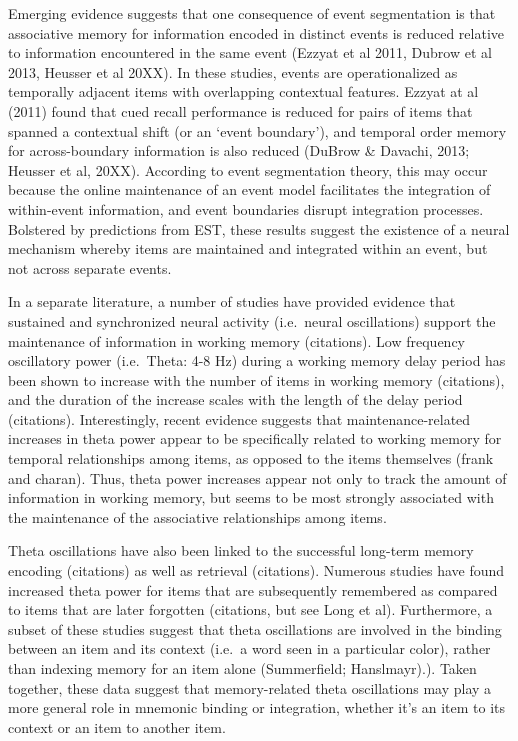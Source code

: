 Emerging evidence suggests that one consequence of event segmentation is
that associative memory for information encoded in distinct events is
reduced relative to information encountered in the same event (Ezzyat et
al 2011, Dubrow et al 2013, Heusser et al 20XX). In these studies,
events are operationalized as temporally adjacent items with overlapping
contextual features. Ezzyat at al (2011) found that cued recall
performance is reduced for pairs of items that spanned a contextual
shift (or an `event boundary'), and temporal order memory for
across-boundary information is also reduced (DuBrow \& Davachi, 2013;
Heusser et al, 20XX). According to event segmentation theory, this may
occur because the online maintenance of an event model facilitates the
integration of within-event information, and event boundaries disrupt
integration processes. Bolstered by predictions from EST, these results
suggest the existence of a neural mechanism whereby items are maintained
and integrated within an event, but not across separate events.

In a separate literature, a number of studies have provided evidence
that sustained and synchronized neural activity (i.e.~neural
oscillations) support the maintenance of information in working memory
(citations). Low frequency oscillatory power (i.e.~Theta: 4-8 Hz) during
a working memory delay period has been shown to increase with the number
of items in working memory (citations), and the duration of the increase
scales with the length of the delay period (citations). Interestingly,
recent evidence suggests that maintenance-related increases in theta
power appear to be specifically related to working memory for temporal
relationships among items, as opposed to the items themselves (frank and
charan). Thus, theta power increases appear not only to track the amount
of information in working memory, but seems to be most strongly
associated with the maintenance of the associative relationships among
items.

Theta oscillations have also been linked to the successful long-term
memory encoding (citations) as well as retrieval (citations). Numerous
studies have found increased theta power for items that are subsequently
remembered as compared to items that are later forgotten (citations, but
see Long et al). Furthermore, a subset of these studies suggest that
theta oscillations are involved in the binding between an item and its
context (i.e.~a word seen in a particular color), rather than indexing
memory for an item alone (Summerfield; Hanslmayr).). Taken together,
these data suggest that memory-related theta oscillations may play a
more general role in mnemonic binding or integration, whether it's an
item to its context or an item to another item.

